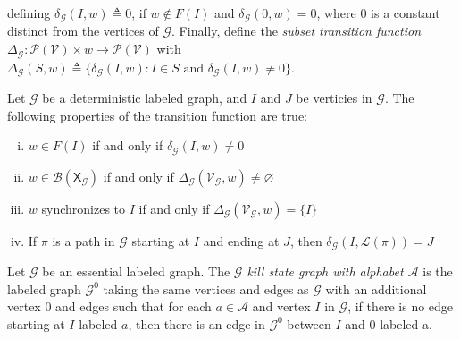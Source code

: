 \documentclass[hidelinks]{article}
\newcommand{\Ac}{\mathcal{A}}  %
\newcommand{\Lc}{\mathcal{L}}  %
\newcommand{\Gc}{\mathcal{G}}  %
\newcommand{\Vc}{\mathcal{V}}
\newcommand{\Bc}{\mathcal{B}}
\newcommand{\shift}[1]{\mathsf{X}_{#1}}
\newcommand{\term}[1]{\textit{#1}}
\theoremstyle{definition}
\begin{document}

defining \(\delta_\Gc(I, w) \triangleq 0\),
if \(w \notin F(I)\) and \(\delta_\Gc(0, w) = 0\), where \(0\) is a constant distinct from the vertices of \(\Gc\). Finally, define 
the \term{subset transition function} \(\Delta_\Gc : \mathcal{P}(\Vc) \times w \to \mathcal{P}(\Vc)\)
with \(\Delta_\Gc(S, w) \triangleq \{ \delta_\Gc(I, w) : I \in S \text{ and } \delta_\Gc(I, w) \neq 0\}\).

\begin{theorem}
    Let \(\Gc\) be a deterministic labeled graph, and \(I\) and \(J\) be verticies in \(\Gc\). The following properties of the 
    transition function are true:

    \begin{enumerate}[(i)]
        \item \(w \in F(I)\) if and only if \(\delta_\Gc(I, w) \neq 0\)
        \item \(w \in \Bc(\shift\Gc)\) if and only if \(\Delta_\Gc(\Vc_\Gc, w) \neq \varnothing\)
        \item \(w\) synchronizes to \(I\) if and only if \(\Delta_\Gc(\Vc_\Gc, w) = \{I\}\)
        \item If \(\pi\) is a path in \(\Gc\) starting at \(I\) and ending at \(J\), then \(\delta_\Gc(I, \Lc(\pi)) = J\)
    \end{enumerate}
\end{theorem}

\begin{definition}
    Let \(\Gc\) be an essential labeled graph. The \term{\(\Gc\) kill state graph with alphabet \(\Ac\)}
    is the labeled graph \(\Gc^0\) taking the same vertices and edges as \(\Gc\) with 
    an additional vertex \(0\) and edges such that for each \(a \in \Ac\) and vertex \(I\) in \(\Gc\),
    if there is no edge starting at \(I\) labeled \(a\), then there is an edge in \(\Gc^0\) 
    between \(I\) and \(0\) labeled a.
\end{definition}
\end{document}
